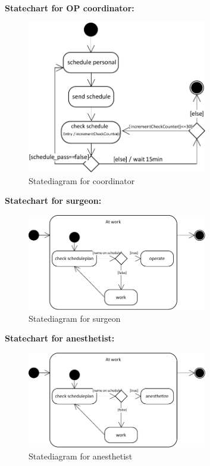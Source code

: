  \textbf{Statechart for OP coordinator:}
\begin{figure}[!htb]
  \centering  
  \includegraphics[width=0.7\textwidth]{pics/ub3/b/1b_orga_stat} 
  \caption{Statediagram for coordinator}
  \label{fig:1b_orga_stat} 
 \end{figure}
 
 \newpage
 
  \textbf{Statechart for surgeon:}
\begin{figure}[!htb]
  \centering  
  \includegraphics[width=0.7\textwidth]{pics/ub3/b/1b_chir_stat} 
  \caption{Statediagram for surgeon}
  \label{fig:1b_chir_stat} 
 \end{figure}
 
   \textbf{Statechart for anesthetist:}
\begin{figure}[!htb]
  \centering  
  \includegraphics[width=0.7\textwidth]{pics/ub3/b/1b_anest_stat} 
  \caption{Statediagram for anesthetist}
  \label{fig:1b_anest_stat} 
 \end{figure}
 
